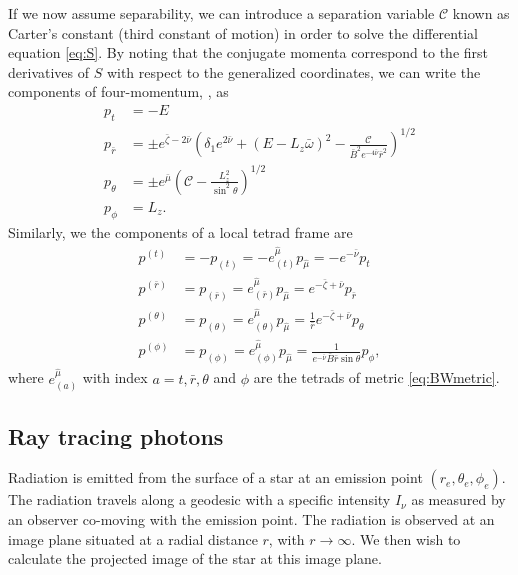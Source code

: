 \documentclass[iop, usenatbib]{emulateapj}
\makeatletter
\def\fvec#1{\underline{\sbox\tw@{$#1$}\dp\tw@\z@\box\tw@}}
\newcommand{\Ca}{\ensuremath{\mathcal{C}}}
\newcommand{\rb}{\ensuremath{\bar{r}}}
\newcommand{\wb}{\ensuremath{\bar{\omega}}}
\newcommand{\nub}{\ensuremath{\bar{\nu}}}
\newcommand{\zetab}{\ensuremath{\bar{\zeta}}}
\newcommand{\Bb}{\ensuremath{\bar{B}}}
\newcommand{\mub}{\ensuremath{\bar{\mu}}}
\makeatother
\begin{document}
If we now assume separability, we can introduce a separation variable
$\Ca$ known as Carter's constant (third constant of motion) in order to
solve the differential equation \eqref{eq:S}.  By noting that the
conjugate momenta correspond to the first derivatives of $S$ with
respect to the generalized coordinates, we can write the components of 
four-momentum, \fvec{p}, as
\begin{align}
  p_t        &= -E \label{eq:p_t}\\
  p_{\rb}    &= \pm e^{\zetab - 2\nub} \left( \delta_1 e^{2\nub} + (E - L_z \wb)^2 - \frac{\Ca}{\Bb^2 e^{-4\nub} \rb^2} \right)^{1/2}\label{eq:p_r}\\
  p_{\theta} &= \pm e^{\mub} \left( \Ca - \frac{L_z^2}{\sin^2\theta} \right)^{1/2}\label{eq:p_the}\\
  p_{\phi}   &= L_z\label{eq:p_p}.
\end{align}
Similarly, we the components of a local tetrad frame are
\begin{align}
  p^{(t)} &= -p_{(t)} = -e_{(t)}^{\hat{\mu}} p_{\hat{\mu}} = -e^{-\nub}p_t \label{eq:tetp_t}\\
  p^{(\rb)} &= p_{(\rb)} = e_{(\rb)}^{\hat{\mu}} p_{\hat{\mu}} = e^{-\zetab + \nub} p_{\rb} \label{eq:tetp_r}\\
  p^{(\theta)} &= p_{(\theta)} = e_{(\theta)}^{\hat{\mu}} p_{\hat{\mu}} = \frac{1}{\rb} e^{-\zetab+\nub} p_{\theta} \label{eq:tetp_theta}\\
  p^{(\phi)} &= p_{(\phi)} = e_{(\phi)}^{\hat{\mu}} p_{\hat{\mu}} = \frac{1}{e^{-\nub} \Bb \rb \sin\theta} p_{\phi} \label{eq:tetp_phi},
\end{align}
where $e^{\hat{\mu}}_{(a)}$ with index $a = t, \rb, \theta$ and $\phi$ are the tetrads of metric \eqref{eq:BWmetric}.


\subsection{Ray tracing photons}
Radiation is emitted from the surface of a star at an emission point
$(r_e,\theta_e,\phi_e)$.  The radiation travels along a geodesic with a
specific intensity $I_{\nu}$ as measured by an observer co-moving with
the emission point.  The radiation is observed at an image plane
situated at a radial distance $r$, with $r\rightarrow\infty$.  We then
wish to calculate the projected image of the star at this image plane.
\end{document}
